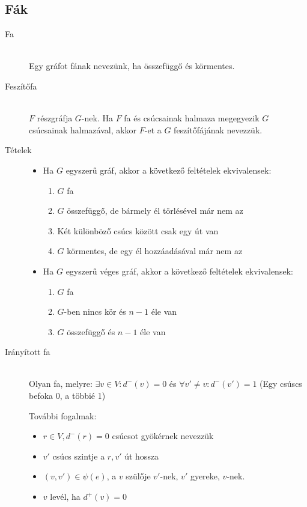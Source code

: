 \documentclass[margin=0px]{article}
\begin{document}
		\subsection{Fák}
			\begin{description}
				\item[Fa]\hfill \\
					Egy gráfot fának nevezünk, ha összefüggő és körmentes.
				\item[Feszítőfa] \hfill \\
					$F$ részgráfja $G$-nek. Ha $F$ fa és csúcsainak halmaza megegyezik $G$ csúcsainak halmazával, akkor $F$-et a $G$ feszítőfájának nevezzük.
				\item[Tételek] \hfill
					\begin{itemize}
						\item Ha $G$ egyszerű gráf, akkor a következő feltételek ekvivalensek:
						\begin{enumerate}
							\item $G$ fa
							\item $G$ összefüggő, de bármely él törlésével már nem az
							\item Két különböző csúcs között csak egy út van
							\item $G$ körmentes, de egy él hozzáadásával már nem az
						\end{enumerate}
						\item Ha $G$ egyszerű véges gráf, akkor a következő feltételek ekvivalensek:
						\begin{enumerate}
							\item $G$ fa
							\item $G$-ben nincs kör és $n-1$ éle van
							\item $G$ összefüggő és $n-1$ éle van 
						\end{enumerate}
					\end{itemize}
				\item[Irányított fa] \hfill \\
					Olyan fa, melyre: $\exists v \in V : d^-(v) = 0$ és $\forall v'\neq v : d^-(v') = 1$
					(Egy csúscs befoka 0, a többié 1)
					
					További fogalmak:
					\begin{itemize}
						\item $r \in V, d^-(r) = 0 $ csúcsot gyökérnek nevezzük 
						\item $v'$ csúcs szintje a $r,v'$ út hossza
						\item $(v,v')\in\psi(e)$, a $v$ szülője $v'$-nek, $v'$ gyereke, $v$-nek.
						\item $v$ levél, ha $d^+(v)=0$
					\end{itemize}
			\end{description}
\end{document}
